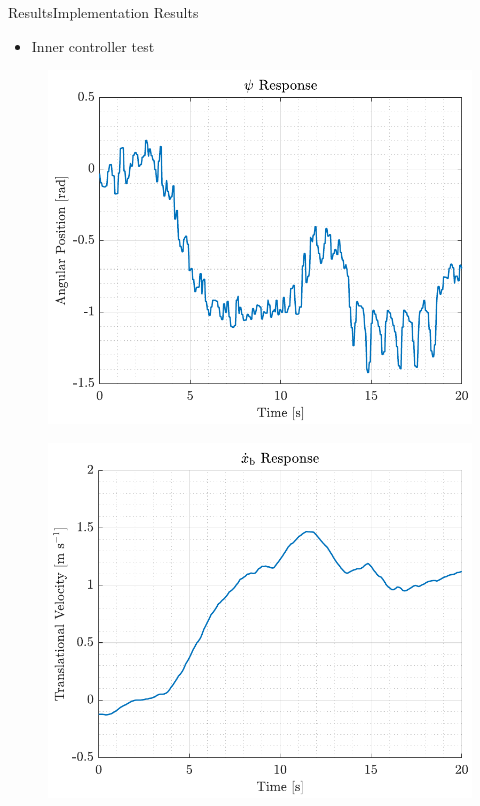 \begin{frame}{Results}{Implementation Results}
    \begin{itemize}
        \item Inner controller test
    \end{itemize}
    \begin{minipage}{0.5\linewidth}
        \begin{figure}[H]
            \centering
            \includegraphics[width=1\linewidth]{figures/inner_yaw}
        \end{figure}       
    \end{minipage}\hfill      
    \begin{minipage}{0.5\linewidth}
        \begin{figure}[H]
            \centering
            \includegraphics[width=1\linewidth]{figures/inner_xbdot}
        \end{figure}             
    \end{minipage}\hfill \\    
\end{frame}

